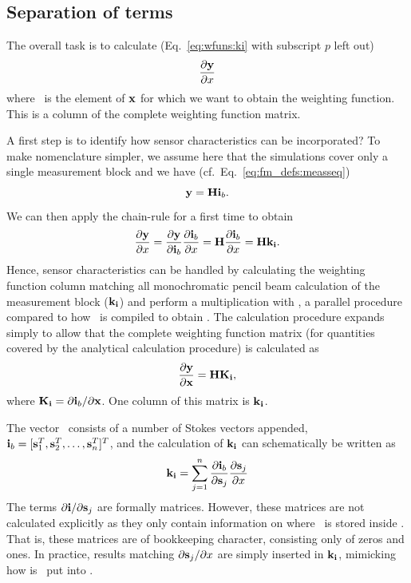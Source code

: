 \subsection{Separation of terms}
\label{sec:wfuns:atmvars:sepe}
%
The overall task is to calculate (Eq.~\ref{eq:wfuns:ki} with subscript $p$ left
out)
\begin{displaymath}
  \frac{\partial\mathbf{y}}{\partial x}  
\end{displaymath}
where \SttElm\ is the element of $\mathbf{x}$ for which we want to obtain the
weighting function. This is a column of the complete weighting function matrix.

A first step is to identify how sensor characteristics can be incorporated? To
make nomenclature simpler, we assume here that the simulations cover only a
single measurement block and we have (cf.\ Eq.~\ref{eq:fm_defs:measseq})
\begin{equation}
  \mathbf{y} = \mathbf{H}\mathbf{i}_{b}.
  \label{eq:wfuns:Hi}
\end{equation}
We can then apply the chain-rule for a first time to obtain 
\begin{equation}
  \frac{\partial\mathbf{y}}{\partial x} = 
  \frac{\partial\mathbf{y}}{\partial\mathbf{i}_{b}} 
  \frac{\partial\mathbf{i}_{b}}{\partial x} = 
  \mathbf{H} \frac{\partial\mathbf{i}_{b}}{\partial x} = \mathbf{H}\mathbf{k}_{\mathbf{i}}.
  \label{eq:wfuns:Hk}
\end{equation}
Hence, sensor characteristics can be handled by calculating the weighting
function column matching all monochromatic pencil beam calculation of the
measurement block ($\mathbf{k}_{\mathbf{i}}$) and perform a multiplication with
\SnsMtr, a parallel procedure compared to how \ is compiled to obtain
\MsrVct. The calculation procedure expands simply to allow that the complete
weighting function matrix (for quantities covered by the analytical calculation
procedure) is calculated as
\begin{equation}
  \frac{\partial\mathbf{y}}{\partial\mathbf{x}} = \mathbf{H}\mathbf{K}_{\mathbf{i}},
  \label{eq:wfuns:HK}
\end{equation}
where $\mathbf{K}_{\mathbf{i}} = \partial\mathbf{i}_{b}/\partial\mathbf{x}$. One column of this
matrix is $\mathbf{k}_{\mathbf{i}}$.

The vector \ consists of a number of Stokes vectors appended,
$\mathbf{i}_{b}=[{\bf s}_{1}^T, {\bf s}_{2}^T,\dots,{\bf s}_{n}^T]^T$, and the
calculation of $\mathbf{k}_{\mathbf{i}}$ can schematically be written as
\begin{equation}
  \mathbf{k}_{\mathbf{i}} = \sum_{j=1}^n \frac{\partial\mathbf{i}_{b}}{\partial{\bf s}_{j}}
    \frac{\partial{\bf s}_{j}}{\partial x}
  \label{eq:wfuns:kisum}
\end{equation}
The terms $\partial\mathbf{i}/\partial{\bf s}_{j}$ are formally matrices. However,
these matrices are not calculated explicitly as they only contain information
on where \ is stored inside \MpiVct. That is, these matrices are of
bookkeeping character, consisting only of zeros and ones. In practice, results
matching $\partial{\bf s}_{j}/\partial x$ are simply inserted in
$\mathbf{k}_{\mathbf{i}}$, mimicking how is \ put into \MpiVct.

